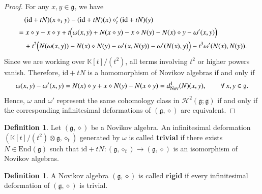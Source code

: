 \documentclass[12pt]{amsart}
\theoremstyle{definition}
\newtheorem{defi}[thm]{Definition}
\newcommand{\g}{\mathfrak g}
\newcommand{\huaH}{\mathcal{H}}
\newcommand{\id}{\mathrm{id}}
\newcommand{\End}{\mathrm{End}}
\newcommand{\ot}{\otimes}
\newcommand{\nov}{{\rm Nov}}
\newcommand{\ome}{\omega}
\begin{document}
\begin{proof}
For any $x,y\in\g$, we have
\begin{align*}
&\quad(\mathrm{id}+tN)(x\diamond_t y)-(\mathrm{id}+tN)(x)\diamond_t'(\mathrm{id}+tN)(y)\\
&=x\diamond y-x\diamond y+t\Bigl(\omega(x,y)+N(x\diamond y)-x\diamond N(y)-N(x)\diamond y-\omega'(x,y)\Bigr)\\
&\quad+t^2\Bigl(N(\omega(x,y))-N(x)\diamond N(y)-\omega'(x,N(y))-\omega'(N(x),y)\Bigr)-t^3\omega'(N(x),N(y)).
\end{align*}
Since we are working over $\mathds{K}[t]/(t^2)$, all terms involving
$t^2$ or higher powers vanish.
Therefore, $\mathrm{id}+tN$ is a homomorphism of Novikov algebras if
and only if
\[
\omega(x,y)-\omega'(x,y)
=
N(x)\diamond y+x\diamond N(y)-N(x\diamond y)=d_\nov^1(N)(x,y),
\qquad \forall\,x,y\in\g.
\]
Hence, $\omega$ and $\omega'$ represent the same cohomology class in
$\huaH^2(\g;\g)$ if and only if the corresponding infinitesimal
deformations of $(\g,\diamond)$ are equivalent.
\end{proof}


\begin{defi}
Let $(\g,\diamond)$ be a Novikov algebra.  An infinitesimal deformation $(\mathds{K}[t]/(t^2)\ot\g, \diamond_t)$  generated by $\ome$ is called \textbf{trivial} if there exists $N\in\End(\g)$ such that
$\id+tN:(\g,\diamond_t)\to (\g,\diamond)$ is an isomorphism of Novikov algebras.
\end{defi}

\begin{defi}
	A Novikov algebra $(\g,\diamond)$ is called \textbf{rigid} if every
	infinitesimal deformation of $(\g,\diamond)$ is trivial.
\end{defi}
\end{document}
